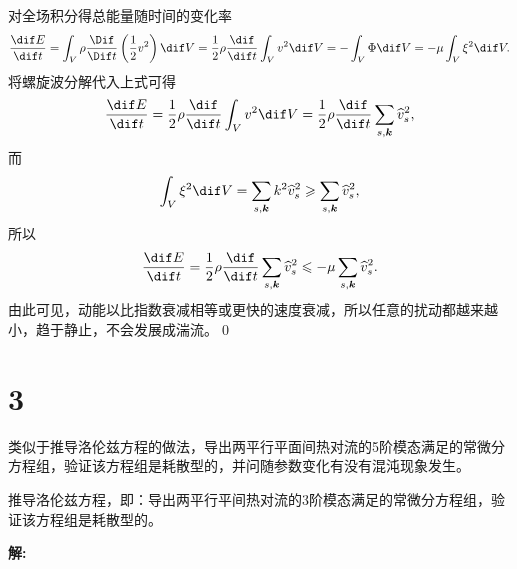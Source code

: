 \documentclass[12pt]{ctexart}
\begin{document}
对全场积分得总能量随时间的变化率\cite[P36]{wu_vortical_flows}
\begin{equation}
	\frac{\dif E}{\dif t} = \int_V \rho \frac{\Dif}{\Dif t}\left(\frac{1}{2}v^2\right) \dif V =  \frac{1}{2} \rho \frac{\dif }{\dif t} \int_V v^2 \dif V = -\int_V \Phi \dif V = - \mu  \int_V \xi^2 \dif V.
\end{equation}
将螺旋波分解代入上式可得
\begin{equation}
	\frac{\dif E}{\dif t} = \frac{1}{2} \rho \frac{\dif }{\dif t} \int_V v^2 \dif V =  \frac{1}{2} \rho \frac{\dif }{\dif t} \sum_{s,\bm{k}} \widehat{v}_{s}^2,
\end{equation}
而
\begin{equation}
	\int_V \xi^2 \dif V = \sum_{s, \boldsymbol{k}} k^2 \widehat{v}_{s}^2 \geqslant \sum_{s, \boldsymbol{k}} \widehat{v}_{s}^2,
\end{equation}
所以
\begin{equation}
	\frac{\dif E}{\dif t} = \frac{1}{2} \rho \frac{\dif }{\dif t} \sum_{s,\bm{k}} \widehat{v}_{s}^2 \leqslant - \mu \sum_{s, \boldsymbol{k}}  \widehat{v}_{s}^2.
\end{equation}
由此可见，动能以比指数衰减相等或更快的速度衰减，所以任意的扰动都越来越小，趋于静止，不会发展成湍流。\qed


\section{3}

类似于推导洛伦兹方程的做法，导出两平行平面间热对流的5阶模态满足的常微分方程组，验证该方程组是耗散型的，并问随参数变化有没有混沌现象发生。

推导洛伦兹方程，即：导出两平行平间热对流的3阶模态满足的常微分方程组，验证该方程组是耗散型的。

\textsf{\hspace{-2em}\sf  \textbf{解:}}
\end{document}
